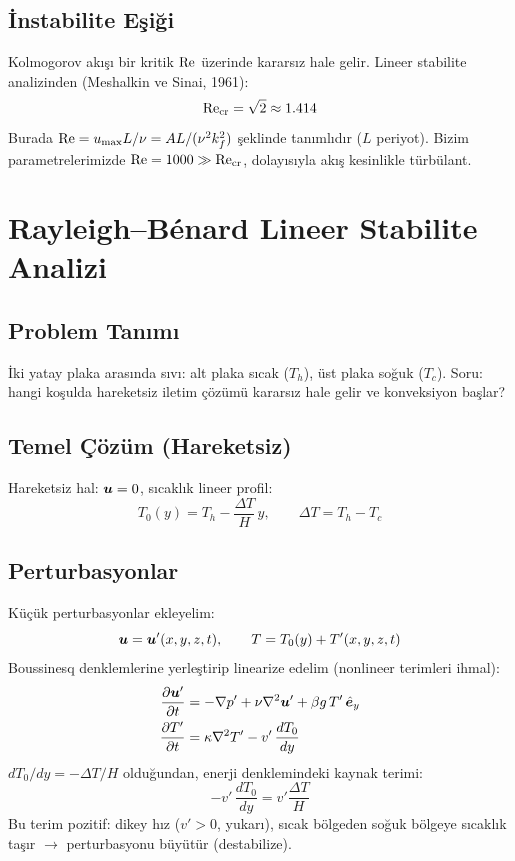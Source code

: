 \subsection{İnstabilite Eşiği}

Kolmogorov akışı bir kritik $\mathrm{Re}$ üzerinde kararsız hale gelir. Lineer stabilite analizinden (Meshalkin ve Sinai, 1961):
\begin{equation}
    \mathrm{Re}_{\text{cr}} = \sqrt{2} \approx 1.414
    \label{eq:kolmogorov_recr}
\end{equation}
Burada $\mathrm{Re} = u_{\max} L / \nu = A L / (\nu^2 k_f^2)$ şeklinde tanımlıdır ($L$ periyot). Bizim parametrelerimizde $\mathrm{Re} = 1000 \gg \mathrm{Re}_{\text{cr}}$, dolayısıyla akış kesinlikle türbülant.


\section{Rayleigh--B\'{e}nard Lineer Stabilite Analizi}
\label{sec:rb_stability}

\subsection{Problem Tanımı}

İki yatay plaka arasında sıvı: alt plaka sıcak ($T_h$), üst plaka soğuk ($T_c$). Soru: hangi koşulda hareketsiz iletim çözümü kararsız hale gelir ve konveksiyon başlar?

\subsection{Temel Çözüm (Hareketsiz)}

Hareketsiz hal: $\bm{u} = 0$, sıcaklık lineer profil:
\begin{equation}
    T_0(y) = T_h - \frac{\Delta T}{H} \, y, \qquad \Delta T = T_h - T_c
\end{equation}

\subsection{Perturbasyonlar}

Küçük perturbasyonlar ekleyelim:
\begin{equation}
    \bm{u} = \bm{u}'(x,y,z,t), \qquad T = T_0(y) + T'(x,y,z,t)
\end{equation}
Boussinesq denklemlerine yerleştirip linearize edelim (nonlineer terimleri ihmal):
\begin{align}
    \frac{\partial \bm{u}'}{\partial t} &= -\nabla p' + \nu \nabla^2 \bm{u}' + \beta g \, T' \, \hat{\bm{e}}_y \label{eq:rb_momentum} \\
    \frac{\partial T'}{\partial t} &= \kappa \nabla^2 T' - v' \, \frac{dT_0}{dy} \label{eq:rb_energy}
\end{align}
$dT_0/dy = -\Delta T/H$ olduğundan, enerji denklemindeki kaynak terimi:
\begin{equation}
    -v' \, \frac{dT_0}{dy} = v' \frac{\Delta T}{H}
\end{equation}
Bu terim pozitif: dikey hız ($v' > 0$, yukarı), sıcak bölgeden soğuk bölgeye sıcaklık taşır $\to$ perturbasyonu büyütür (destabilize).

